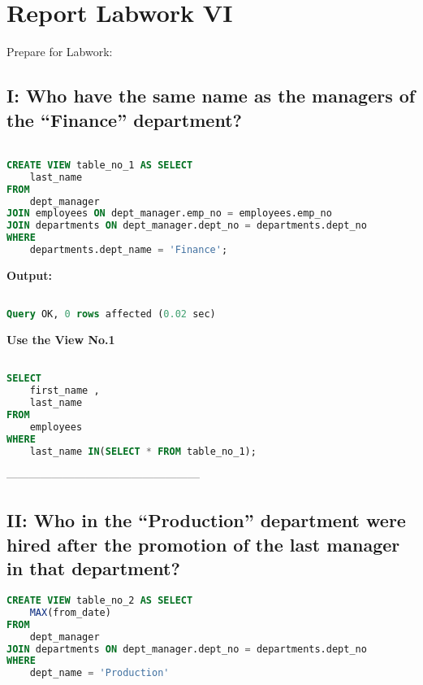 \documentclass[12pt]{report}
\begin{document}
\section*{Report Labwork VI}

Prepare for Labwork:

{\small
{}}

\subsection*{I: Who have the same name as the managers of the “Finance” department?}

\begin{lstlisting}[language=sql]

CREATE VIEW table_no_1 AS SELECT
	last_name
FROM
	dept_manager
JOIN employees ON dept_manager.emp_no = employees.emp_no
JOIN departments ON dept_manager.dept_no = departments.dept_no
WHERE
	departments.dept_name = 'Finance';

\end{lstlisting}


\textbf{Output:}

\begin{lstlisting}[language=sql]

Query OK, 0 rows affected (0.02 sec)

\end{lstlisting}

\textbf{Use the View No.1}
\begin{lstlisting}[language=sql]

SELECT
	first_name ,
	last_name
FROM
	employees
WHERE
	last_name IN(SELECT * FROM table_no_1);

\end{lstlisting}


---------------------------------------------------


\subsection*{II: Who in the “Production” department were hired after the promotion of the last manager in that department?}

\begin{lstlisting}[language=sql]
CREATE VIEW table_no_2 AS SELECT
	MAX(from_date)
FROM
	dept_manager
JOIN departments ON dept_manager.dept_no = departments.dept_no
WHERE
	dept_name = 'Production'
\end{lstlisting}
\end{document}
